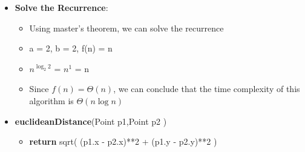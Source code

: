 \documentclass{article}[12pt]
\begin{document}
\begin{itemize}
  \item \textbf{Solve the Recurrence}:
    \begin{itemize}
      \item Using master's theorem, we can solve the recurrence
      \item a = 2, b = 2, f(n) = n
      \item $n^{\log_{2} 2}$ = $n^{1}$ = n
      \item Since $f(n) = \Theta(n)$, we can conclude that
        the time complexity of this algorithm is $\Theta(n \log n)$
    \end{itemize}
  \item \textbf{euclideanDistance}(Point p1,Point p2 )
    \begin{itemize}
      \item \textbf{return} sqrt( (p1.x - p2.x)**2 + (p1.y - p2.y)**2 )
    \end{itemize}
\end{itemize}

\pagebreak
\end{document}
